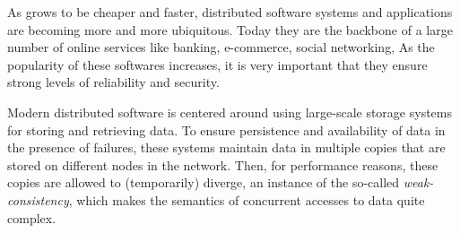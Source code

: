 


As \internet{} grows to be cheaper and faster, distributed software systems and applications are becoming more and more ubiquitous.
Today they are the backbone of a large number of online services like banking, e-commerce, social networking, \etc{}
As the popularity of these softwares increases, it is very important that they ensure strong levels of reliability and security.


Modern distributed software is centered around using large-scale storage systems for storing and retrieving data. 
To ensure persistence and availability of data in the presence of failures, these systems maintain data
in multiple copies that are stored on different nodes in the network. Then, for performance reasons, these copies
are allowed to (temporarily) diverge, an instance of the so-called \emph{weak-consistency}, 
which makes the semantics of concurrent accesses to data quite complex.


